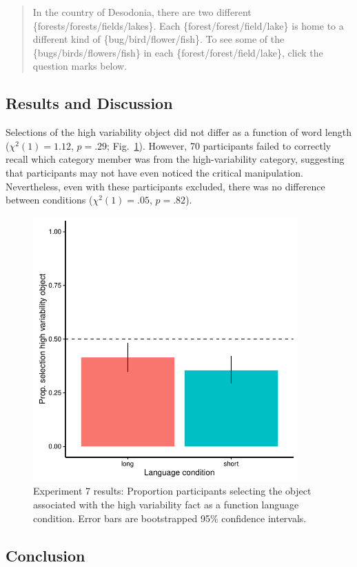 \begin{quote}
In the country of Desodonia, there are two different \{forests/forests/fields/lakes\}. Each \{forest/forest/field/lake\}  is home to a different kind of \{bug/bird/flower/fish\}. To see some of the \{bugs/birds/flowers/fish\} in each \{forest/forest/field/lake\}, click the question marks below.
\end{quote}

\subsection{Results and Discussion}

Selections of the high variability object did not differ as a function of word length (${\chi}^2$$(1) = 1.12$, $p = .29$; Fig.\ \ref{fig:var_plot}). However, 70 participants failed to correctly recall which category member was from the high-variability category, suggesting that participants may not have even noticed the critical manipulation. Nevertheless, even with these participants excluded, there was no difference between conditions (${\chi}^2$$(1) = .05$, $p = .82$).

  \begin{figure}
 \begin{center}
  \includegraphics[width=4in]{figs/var_results.pdf}
  \caption{\label{fig:var_plot} Experiment 7 results: Proportion participants selecting the object associated with the high variability fact as a function language condition.  Error bars are bootstrapped 95\% confidence intervals.}
 \end{center}
\end{figure}

\subsection{Conclusion}










